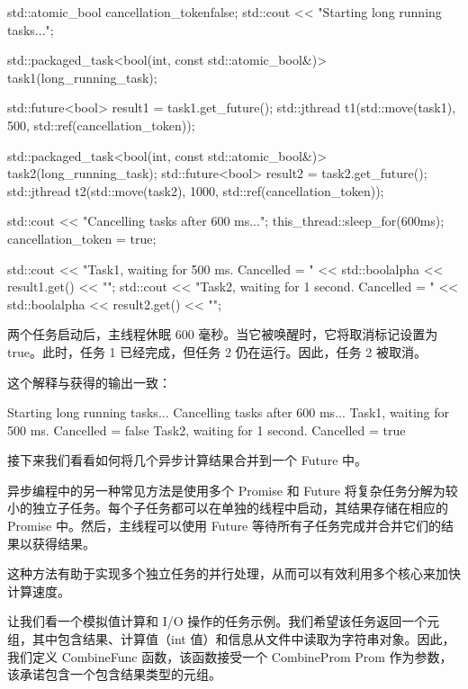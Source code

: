 \begin{cpp}
std::atomic_bool cancellation_token{false};
std::cout << "Starting long running tasks...\n";

std::packaged_task<bool(int, const std::atomic_bool&)>
                task1(long_running_task);

std::future<bool> result1 = task1.get_future();
std::jthread t1(std::move(task1), 500,
                std::ref(cancellation_token));

std::packaged_task<bool(int, const std::atomic_bool&)>
                task2(long_running_task);
std::future<bool> result2 = task2.get_future();
std::jthread t2(std::move(task2), 1000,
                std::ref(cancellation_token));

std::cout << "Cancelling tasks after 600 ms...\n";
this_thread::sleep_for(600ms);
cancellation_token = true;

std::cout << "Task1, waiting for 500 ms. Cancelled = "
          << std::boolalpha << result1.get() << "\n";
std::cout << "Task2, waiting for 1 second. Cancelled = "
          << std::boolalpha << result2.get() << "\n";
\end{cpp}

两个任务启动后，主线程休眠 600 毫秒。当它被唤醒时，它将取消标记设置为 true。此时，任务 1 已经完成，但任务 2 仍在运行。因此，任务 2 被取消。

这个解释与获得的输出一致：

\begin{shell}
Starting long running tasks...
Cancelling tasks after 600 ms...
Task1, waiting for 500 ms. Cancelled = false
Task2, waiting for 1 second. Cancelled = true
\end{shell}

接下来我们看看如何将几个异步计算结果合并到一个 Future 中。


异步编程中的另一种常见方法是使用多个 Promise 和 Future 将复杂任务分解为较小的独立子任务。每个子任务都可以在单独的线程中启动，其结果存储在相应的 Promise 中。然后，主线程可以使用 Future 等待所有子任务完成并合并它们的结果以获得结果。

这种方法有助于实现多个独立任务的并行处理，从而可以有效利用多个核心来加快计算速度。

让我们看一个模拟值计算和 I/O 操作的任务示例。我们希望该任务返回一个元组，其中包含结果、计算值（int 值）和信息从文件中读取为字符串对象。因此，我们定义 CombineFunc 函数，该函数接受一个 CombineProm Prom 作为参数，该承诺包含一个包含结果类型的元组。

